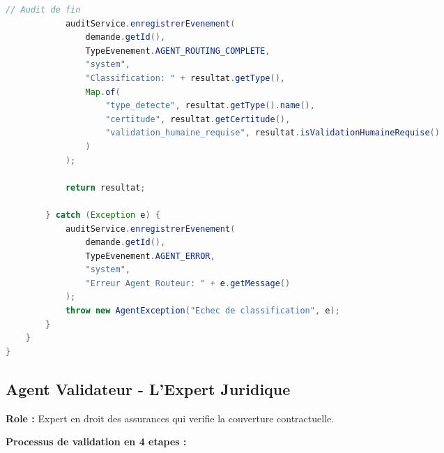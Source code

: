 \documentclass[a4paper,12pt]{article}
\begin{document}
\begin{lstlisting}[language=Java]
            // Audit de fin
            auditService.enregistrerEvenement(
                demande.getId(),
                TypeEvenement.AGENT_ROUTING_COMPLETE,
                "system",
                "Classification: " + resultat.getType(),
                Map.of(
                    "type_detecte", resultat.getType().name(),
                    "certitude", resultat.getCertitude(),
                    "validation_humaine_requise", resultat.isValidationHumaineRequise()
                )
            );
            
            return resultat;
            
        } catch (Exception e) {
            auditService.enregistrerEvenement(
                demande.getId(),
                TypeEvenement.AGENT_ERROR,
                "system",
                "Erreur Agent Routeur: " + e.getMessage()
            );
            throw new AgentException("Echec de classification", e);
        }
    }
}
\end{lstlisting}

\subsection{Agent Validateur - L'Expert Juridique}

\textbf{Role :} Expert en droit des assurances qui verifie la couverture contractuelle.

\textbf{Processus de validation en 4 etapes :}

\begin{center}
\begin{adjustbox}{max width=0.95\textwidth,center}
\end{adjustbox}
\end{center}
\end{document}
